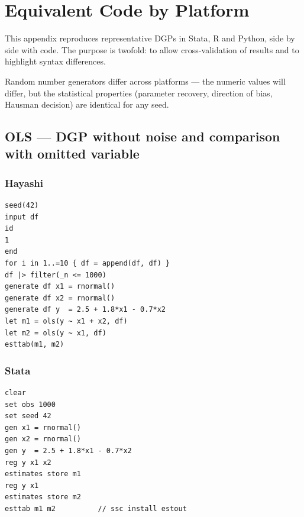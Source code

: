 \chapter{Equivalent Code by Platform}
\label{apendice:equivalencias}

This appendix reproduces representative DGPs in Stata, R and Python, side
by side with \hayashi{} code. The purpose is twofold: to allow cross-validation
of results and to highlight syntax differences.

\begin{nota}
  Random number generators differ across platforms — the numeric
  values will differ, but the statistical properties
  (parameter recovery, direction of bias, Hausman decision)
  are identical for any seed.
\end{nota}

\section{OLS — DGP without noise and comparison with omitted variable}

\subsection*{Hayashi}

\begin{lstlisting}
seed(42)
input df
id
1
end
for i in 1..=10 { df = append(df, df) }
df |> filter(_n <= 1000)
generate df x1 = rnormal()
generate df x2 = rnormal()
generate df y  = 2.5 + 1.8*x1 - 0.7*x2
let m1 = ols(y ~ x1 + x2, df)
let m2 = ols(y ~ x1, df)
esttab(m1, m2)
\end{lstlisting}

\subsection*{Stata}

\begin{lstlisting}[language={}, basicstyle=\ttfamily\small,
  frame=single, numbers=none, backgroundcolor=\color{codbg}]
clear
set obs 1000
set seed 42
gen x1 = rnormal()
gen x2 = rnormal()
gen y  = 2.5 + 1.8*x1 - 0.7*x2
reg y x1 x2
estimates store m1
reg y x1
estimates store m2
esttab m1 m2          // ssc install estout
\end{lstlisting}

